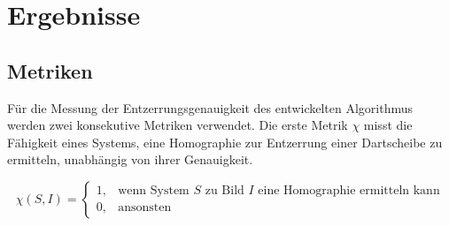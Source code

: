 
\section{Ergebnisse}
\label{sec:cv:ergebnisse}



\subsection{Metriken}
\label{sec:cv_metriken}

Für die Messung der Entzerrungsgenauigkeit des entwickelten Algorithmus werden zwei konsekutive Metriken verwendet. Die erste Metrik $\chi$ misst die Fähigkeit eines Systems, eine Homographie zur Entzerrung einer Dartscheibe zu ermitteln, unabhängig von ihrer Genauigkeit.

\begin{equation*}
    \chi(S, I) =
    \begin{cases}
        1, & \text{wenn System $S$ zu Bild $I$ eine Homographie ermitteln kann} \\
        0, & \text{ansonsten}
    \end{cases}
\end{equation*}

